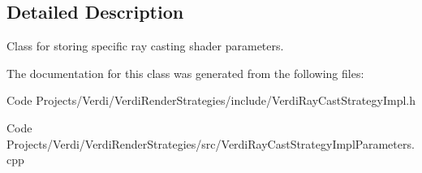 \subsection{\-Detailed \-Description}
\-Class for storing specific ray casting shader parameters. 

\-The documentation for this class was generated from the following files\-:\begin{DoxyCompactItemize}
\item 
\-Code Projects/\-Verdi/\-Verdi\-Render\-Strategies/include/\-Verdi\-Ray\-Cast\-Strategy\-Impl.\-h\item 
\-Code Projects/\-Verdi/\-Verdi\-Render\-Strategies/src/\-Verdi\-Ray\-Cast\-Strategy\-Impl\-Parameters.\-cpp\end{DoxyCompactItemize}

